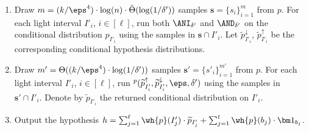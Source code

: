 \begin{algorithm}
\begin{enumerate}
%


\item Draw $m =  (k/\eps^4) \cdot \log(n) \cdot \tilde{\Theta}(\log(1/\delta'))$
samples $\mathbf{s} = \{s_i\}_{i=1}^m$ from $p$. For each light interval $I'_i$, $i \in [\ell]$, run both
$\ANI_{\delta'}$ and $\AND_{\delta'}$ on the conditional distribution $p_{I'_i}$ using the samples in $\mathbf{s} \cap I'_i$. 
Let   $\widetilde{p}^{\downarrow}_{I'_i}$, $\widetilde{p}^{\uparrow}_{I'_i}$  be the corresponding conditional hypothesis distributions.

%


\item Draw $m' = \Theta((k/\eps^4)\cdot \log(1/\delta'))$ samples  $\mathbf{s'} = \{s'_i\}_{i=1}^{m'}$ from $p$.
For each light interval $I'_i$, $i \in [\ell]$,
run  $^p(\widetilde{p}^{\uparrow}_{I'_i},\widetilde{p}^{\downarrow}_{I'_i}, \eps,\delta')$
using the samples in $\mathbf{s'} \cap I'_i$.
Denote by $\widetilde{p}_{I'_i}$ the returned conditional distribution on $I'_i$.

\item Output the hypothesis $h = \sum_{j=1}^{\ell} \wh{p}(I'_j) \cdot \widetilde{p}_{I'_j} + \sum_{j=1}^t \wh{p}(b_j) \cdot {\bm 1}_{b_j}$.
\end{enumerate}
\caption{}\label{alg:learn-kmodal-simple}
\end{algorithm}

